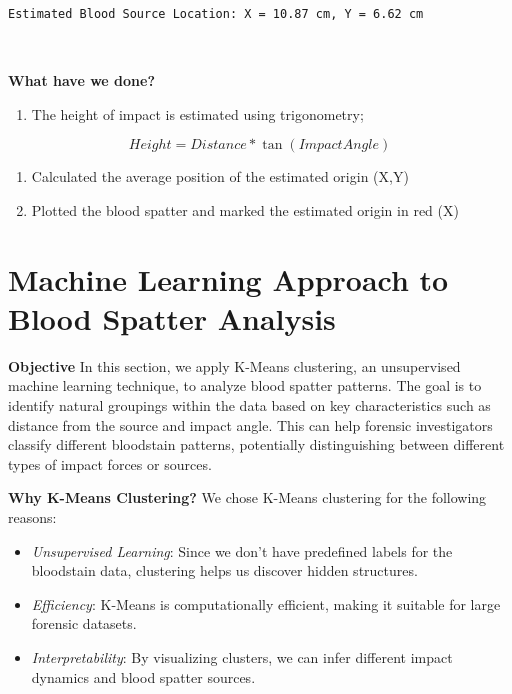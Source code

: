 \documentclass[11pt]{article}
\providecommand{\tightlist}{%
      \setlength{\itemsep}{0pt}\setlength{\parskip}{0pt}}
\begin{document}
    \begin{Verbatim}[commandchars=\\\{\}]
Estimated Blood Source Location: X = 10.87 cm, Y = 6.62 cm
    \end{Verbatim}

    \begin{center}
    \end{center}
    { \hspace*{\fill} \\}
    
    \textbf{What have we done?}

\begin{enumerate}
\def\labelenumi{\arabic{enumi}.}
\tightlist
\item
  The height of impact is estimated using trigonometry;
\end{enumerate}

\[Height = Distance * \tan(Impact Angle)\]

\begin{enumerate}
\def\labelenumi{\arabic{enumi}.}
\setcounter{enumi}{1}
\tightlist
\item
  Calculated the average position of the estimated origin (X,Y)
\item
  Plotted the blood spatter and marked the estimated origin in red (X)
\end{enumerate}

    \section{Machine Learning Approach to Blood Spatter
Analysis}\label{machine-learning-approach-to-blood-spatter-analysis}

\textbf{Objective} In this section, we apply K-Means clustering, an
unsupervised machine learning technique, to analyze blood spatter
patterns. The goal is to identify natural groupings within the data
based on key characteristics such as distance from the source and impact
angle. This can help forensic investigators classify different
bloodstain patterns, potentially distinguishing between different types
of impact forces or sources.

\textbf{Why K-Means Clustering?} We chose K-Means clustering for the
following reasons:

\begin{itemize}
\tightlist
\item
  \emph{Unsupervised Learning}: Since we don't have predefined labels
  for the bloodstain data, clustering helps us discover hidden
  structures.
\item
  \emph{Efficiency}: K-Means is computationally efficient, making it
  suitable for large forensic datasets.
\item
  \emph{Interpretability}: By visualizing clusters, we can infer
  different impact dynamics and blood spatter sources.
\end{itemize}
\end{document}
